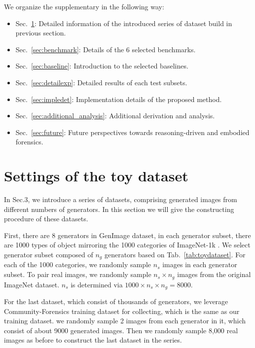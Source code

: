 \clearpage
\setcounter{page}{1}
\maketitlesupplementary

\appendix
We organize the supplementary in the following way:
\begin{itemize}
    \item Sec.~\ref{sec:pre-exp}: Detailed information of the introduced series of dataset build in previous section.
    \item Sec.~\ref{sec:benchmark}: Details of the 6 selected benchmarks. 
    \item Sec.~\ref{sec:baseline}: Introduction to the selected baselines.
    \item Sec.~\ref{sec:detailexp}: Detailed results of each test subsets.
    \item Sec.~\ref{sec:impledet}: Implementation details of the proposed method.
    \item Sec.~\ref{sec:additional_analysis}: Additional derivation and analysis.
    \item Sec.~\ref{sec:future}: Future perspectives towards reasoning-driven and embodied forensics.
\end{itemize}

\section{Settings of the toy dataset}
\label{sec:pre-exp}
In Sec.3, we introduce a series of datasets, comprising generated images from different numbers of generators. In this section we will give the constructing procedure of these datasets.

First, there are 8 generators in GenImage \cite{zhu2024genimage} dataset, in each generator subset, there are 1000 types of object mirroring the 1000 categories of ImageNet-1k \cite{imagenet}. We select generator subset composed of $n_g$ generators based on Tab.~\ref{tab:toydataset}. For each of the 1000 categories, we randomly sample $n_s$ images in each  generator subset. To pair real images, we randomly sample $n_s \times n_g$ images from the original ImageNet dataset. $n_s$ is determined via  $1000 \times n_s \times n_g=8000$.


For the last dataset, which consist of thousands of generators, we leverage Community-Forensics training dataset \cite{park2025commfor} for collecting, which is the same as our training dataset. we randomly sample 2 images from each generator in it, which consist of about 9000 generated images. Then we randomly sample 8,000 real images as before to construct the last dataset in the series.

